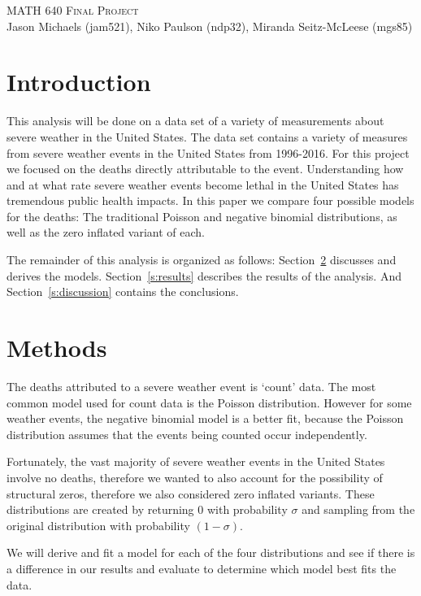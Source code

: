 \documentclass{article}
\begin{document}

\begin{center}
	\vspace{0.1cm}
	\textsc{\LARGE MATH 640 Final Project} \\[0.1cm]
	Jason Michaels (jam521), Niko Paulson (ndp32), Miranda Seitz-McLeese (mgs85) 
\end{center}
\section{Introduction}
\label{s:intro}
This analysis will be done on a data set of a variety of measurements about severe weather in the United States. 
The data set contains a variety of measures from severe weather events in the United States from 1996-2016. 
For this project we focused on the deaths directly attributable to the event.
Understanding how and at what rate severe weather events become lethal in the United States has tremendous public health impacts.
In this paper we compare four possible models for the deaths: The traditional Poisson and negative binomial distributions, as well as the zero inflated variant of each.

The remainder of this analysis is organized as follows: Section~\ref{s:methods} discusses and derives the models. Section~\ref{s:results} describes the results of the analysis. And Section~\ref{s:discussion} contains the conclusions.

\section{Methods}
\label{s:methods}
The deaths attributed to a severe weather event is `count' data. 
The most common model used for count data is the Poisson distribution. 
However for some weather events, the negative binomial model is a better fit, because the Poisson distribution assumes that the events being counted occur independently.

Fortunately, the vast majority of severe weather events in the United States involve no deaths, therefore we wanted to also account for the possibility of structural zeros, therefore we also considered zero inflated variants. 
These distributions are created by returning $0$ with probability $\sigma$ and sampling from the original distribution with probability $(1-\sigma)$. 

We will derive and fit a model for each of the four distributions and see if there is a difference in our results and evaluate to determine which model best fits the data.
\end{document}
